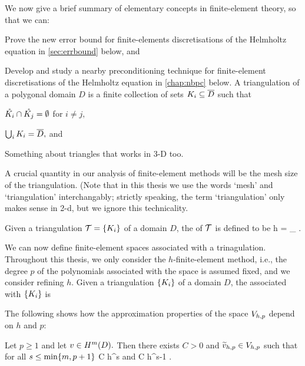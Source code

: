 We now give a brief summary of elementary concepts in finite-element theory, so that we can:
\ben
\item Prove the new error bound for finite-elements discretisations of the Helmholtz equation in \cref{sec:errbound} below, and
  \item Develop and study a nearby preconditioning technique for finite-element discretisations of the Helmholtz equation in \cref{chap:nbpc} below.
\een
    \bde[Triangulation]
    A triangulation of a polygonal domain $D$ is a finite collection of sets $K_{i} \subseteq \overline{D}$ such that
    \ben
  \item $\mathring{K_{i}} \cap \mathring{K_{j}} = \emptyset$ for $ i \neq j,$
  \item $\bigcup_i K_{i} = \overline{D},$ and
    \item Something about triangles that works in 3-D too.
    \een
    \ede


    A crucial quantity in our analysis of finite-element methods will be the mesh size of the triangulation. (Note that in this thesis we use the words `mesh' and `triangulation' interchangably; strictly speaking, the term `triangulation' only makes sense in 2-d, but we ignore this technicality.

Given a triangulation $\cT = \set{\Ki}$ of a domain $D$, the  of $\mathcal T$ is defined to be
\beqs
h = \max_{\Ki} \diam{\Ki}.
\eeqs
\ede

    We can now define finite-element spaces associated with a trinagulation. Throughout this thesis, we only consider the $h$-finite-element method, i.e., the degree $p$ of the polynomials associated with the space is assumed fixed, and we consider refining $h.$
    Given a triangulation $\set{\Ki}$ of a domain $D$, the  associated with $\set{\Ki}$ is
    \beqs
\Vhp \de {}
    \eeqs
    \ede

    The following  shows how the approximation properties of the space $V_{h,p}$ depend on $h$ and $p$:

    \label{lem:scottzhang}
    Let $p \geq 1$ and let $v \in \HmD.$ Then there exists $C>0$ and $\widetilde{v}_{h,p} \in V_{h,p}$ such that for all $s \leq \min\set{m,p+1}$
    \beqs
{} \leq C h^s 
    \eeqs
    and
    \beqs
{} \leq C h^{s-1} .
    \eeqs
    \ele

